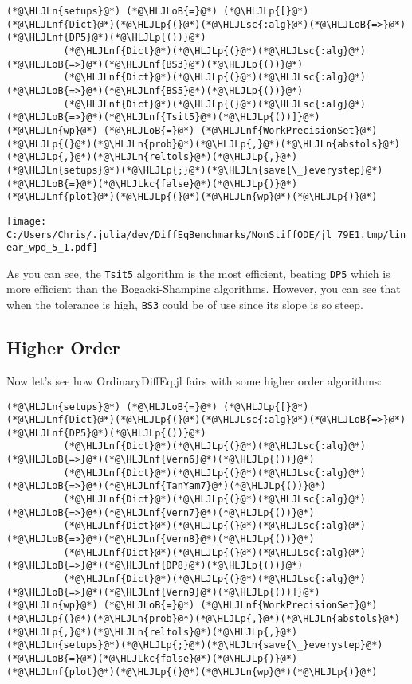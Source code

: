 \documentclass[12pt,a4paper]{article}
\newcommand{\HLJLkc}[1]{\textcolor[RGB]{59,151,46}{\textit{#1}}}
\newcommand{\HLJLn}[1]{#1}
\newcommand{\HLJLnf}[1]{\textcolor[RGB]{66,102,213}{#1}}
\newcommand{\HLJLsc}[1]{\textcolor[RGB]{201,61,57}{#1}}
\newcommand{\HLJLoB}[1]{\textcolor[RGB]{102,102,102}{\textbf{#1}}}
\newcommand{\HLJLp}[1]{#1}
\begin{document}
\begin{lstlisting}
(*@\HLJLn{setups}@*) (*@\HLJLoB{=}@*) (*@\HLJLp{[}@*)(*@\HLJLnf{Dict}@*)(*@\HLJLp{(}@*)(*@\HLJLsc{:alg}@*)(*@\HLJLoB{=>}@*)(*@\HLJLnf{DP5}@*)(*@\HLJLp{())}@*)
          (*@\HLJLnf{Dict}@*)(*@\HLJLp{(}@*)(*@\HLJLsc{:alg}@*)(*@\HLJLoB{=>}@*)(*@\HLJLnf{BS3}@*)(*@\HLJLp{())}@*)
          (*@\HLJLnf{Dict}@*)(*@\HLJLp{(}@*)(*@\HLJLsc{:alg}@*)(*@\HLJLoB{=>}@*)(*@\HLJLnf{BS5}@*)(*@\HLJLp{())}@*)
          (*@\HLJLnf{Dict}@*)(*@\HLJLp{(}@*)(*@\HLJLsc{:alg}@*)(*@\HLJLoB{=>}@*)(*@\HLJLnf{Tsit5}@*)(*@\HLJLp{())]}@*)
(*@\HLJLn{wp}@*) (*@\HLJLoB{=}@*) (*@\HLJLnf{WorkPrecisionSet}@*)(*@\HLJLp{(}@*)(*@\HLJLn{prob}@*)(*@\HLJLp{,}@*)(*@\HLJLn{abstols}@*)(*@\HLJLp{,}@*)(*@\HLJLn{reltols}@*)(*@\HLJLp{,}@*)(*@\HLJLn{setups}@*)(*@\HLJLp{;}@*)(*@\HLJLn{save{\_}everystep}@*)(*@\HLJLoB{=}@*)(*@\HLJLkc{false}@*)(*@\HLJLp{)}@*)
(*@\HLJLnf{plot}@*)(*@\HLJLp{(}@*)(*@\HLJLn{wp}@*)(*@\HLJLp{)}@*)
\end{lstlisting}

\texttt{[image: C:/Users/Chris/.julia/dev/DiffEqBenchmarks/NonStiffODE/jl\_79E1.tmp/linear\_wpd\_5\_1.pdf]}

As you can see, the \texttt{Tsit5} algorithm is the most efficient, beating \texttt{DP5} which is more efficient than the Bogacki-Shampine algorithms. However, you can see that when the tolerance is high, \texttt{BS3} could be of use since its slope is so steep.

\subsection{Higher Order}
Now let's see how OrdinaryDiffEq.jl fairs with some higher order algorithms:


\begin{lstlisting}
(*@\HLJLn{setups}@*) (*@\HLJLoB{=}@*) (*@\HLJLp{[}@*)(*@\HLJLnf{Dict}@*)(*@\HLJLp{(}@*)(*@\HLJLsc{:alg}@*)(*@\HLJLoB{=>}@*)(*@\HLJLnf{DP5}@*)(*@\HLJLp{())}@*)
          (*@\HLJLnf{Dict}@*)(*@\HLJLp{(}@*)(*@\HLJLsc{:alg}@*)(*@\HLJLoB{=>}@*)(*@\HLJLnf{Vern6}@*)(*@\HLJLp{())}@*)
          (*@\HLJLnf{Dict}@*)(*@\HLJLp{(}@*)(*@\HLJLsc{:alg}@*)(*@\HLJLoB{=>}@*)(*@\HLJLnf{TanYam7}@*)(*@\HLJLp{())}@*)
          (*@\HLJLnf{Dict}@*)(*@\HLJLp{(}@*)(*@\HLJLsc{:alg}@*)(*@\HLJLoB{=>}@*)(*@\HLJLnf{Vern7}@*)(*@\HLJLp{())}@*)
          (*@\HLJLnf{Dict}@*)(*@\HLJLp{(}@*)(*@\HLJLsc{:alg}@*)(*@\HLJLoB{=>}@*)(*@\HLJLnf{Vern8}@*)(*@\HLJLp{())}@*)
          (*@\HLJLnf{Dict}@*)(*@\HLJLp{(}@*)(*@\HLJLsc{:alg}@*)(*@\HLJLoB{=>}@*)(*@\HLJLnf{DP8}@*)(*@\HLJLp{())}@*)
          (*@\HLJLnf{Dict}@*)(*@\HLJLp{(}@*)(*@\HLJLsc{:alg}@*)(*@\HLJLoB{=>}@*)(*@\HLJLnf{Vern9}@*)(*@\HLJLp{())]}@*)
(*@\HLJLn{wp}@*) (*@\HLJLoB{=}@*) (*@\HLJLnf{WorkPrecisionSet}@*)(*@\HLJLp{(}@*)(*@\HLJLn{prob}@*)(*@\HLJLp{,}@*)(*@\HLJLn{abstols}@*)(*@\HLJLp{,}@*)(*@\HLJLn{reltols}@*)(*@\HLJLp{,}@*)(*@\HLJLn{setups}@*)(*@\HLJLp{;}@*)(*@\HLJLn{save{\_}everystep}@*)(*@\HLJLoB{=}@*)(*@\HLJLkc{false}@*)(*@\HLJLp{)}@*)
(*@\HLJLnf{plot}@*)(*@\HLJLp{(}@*)(*@\HLJLn{wp}@*)(*@\HLJLp{)}@*)
\end{lstlisting}
\end{document}
